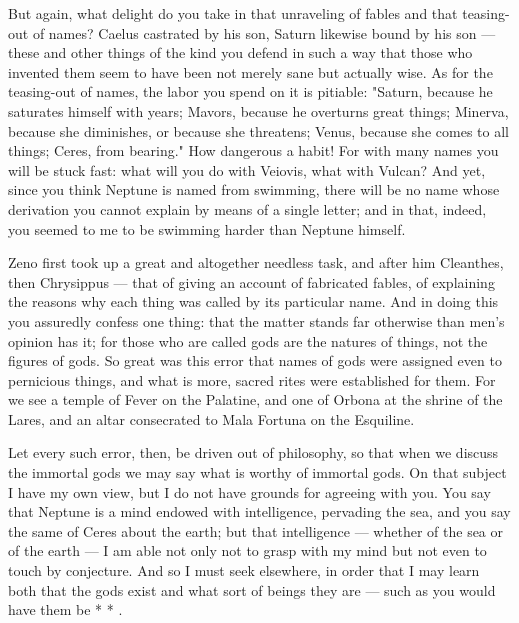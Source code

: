  But again, what delight do you take in that unraveling of fables and that teasing-out of names? Caelus castrated by his son, Saturn likewise bound by his son — these and other things of the kind you defend in such a way that those who invented them seem to have been not merely sane but actually wise. As for the teasing-out of names, the labor you spend on it is pitiable: "Saturn, because he saturates himself with years; Mavors, because he overturns great things; Minerva, because she diminishes, or because she threatens; Venus, because she comes to all things; Ceres, from bearing." How dangerous a habit! For with many names you will be stuck fast: what will you do with Veiovis, what with Vulcan? And yet, since you think Neptune is named from swimming, there will be no name whose derivation you cannot explain by means of a single letter; and in that, indeed, you seemed to me to be swimming harder than Neptune himself.

 Zeno first took up a great and altogether needless task, and after him Cleanthes, then Chrysippus — that of giving an account of fabricated fables, of explaining the reasons why each thing was called by its particular name. And in doing this you assuredly confess one thing: that the matter stands far otherwise than men's opinion has it; for those who are called gods are the natures of things, not the figures of gods. So great was this error that names of gods were assigned even to pernicious things, and what is more, sacred rites were established for them. For we see a temple of Fever on the Palatine, and one of Orbona at the shrine of the Lares, and an altar consecrated to Mala Fortuna on the Esquiline.

 Let every such error, then, be driven out of philosophy, so that when we discuss the immortal gods we may say what is worthy of immortal gods. On that subject I have my own view, but I do not have grounds for agreeing with you. You say that Neptune is a mind endowed with intelligence, pervading the sea, and you say the same of Ceres about the earth; but that intelligence — whether of the sea or of the earth — I am able not only not to grasp with my mind but not even to touch by conjecture. And so I must seek elsewhere, in order that I may learn both that the gods exist and what sort of beings they are — such as you would have them be * * .

